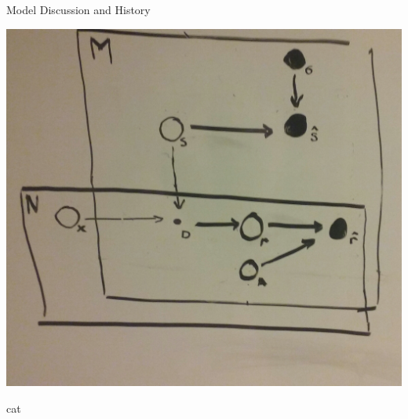 \documentclass[11pt]{beamer}
\begin{document}
\begin{frame}{Model Discussion and History}
\begin{multicols}{3}
\includegraphics[width=0.3\textheight]{pictures/3plate.jpg}
\vfill\columnbreak

cat
\end{multicols}

\end{frame}
\end{document}
